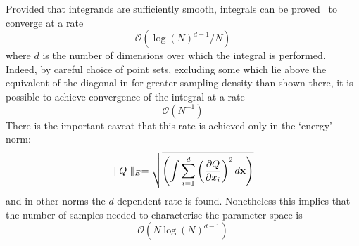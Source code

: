 Provided that integrands are sufficiently smooth,
integrals can be proved~\cite{Bu04Spar} to converge at a rate
\begin{equation}\label{eq:sparsec}
\mathcal{O}(\log(N)^{d-1}/N)
\end{equation}
where $d$ is the number of dimensions over which the integral is performed.
Indeed, by careful choice of point sets, excluding some which
lie above the equivalent of the diagonal in  for
greater sampling density than shown there,
it is possible to achieve convergence of the integral at a rate
\begin{equation}\label{eq:sparsen}
\mathcal{O}(N^{-1})
\end{equation}
There is the important caveat that this rate is achieved only in
the `energy' norm:
\begin{equation}\label{eq:ennorm}
\parallel Q \parallel_E = \sqrt{\left(\int \sum_{i=1}^d \left(\frac{\partial Q}{\partial x_i}\right)^2 d{\bf x}\right)}
\end{equation}
and in other norms the $d$-dependent rate  is found. Nonetheless
this implies that the number of samples needed to characterise the
parameter space is
\begin{equation}\label{eq:nsparsec}
\mathcal{O}(N \log(N)^{d-1})
\end{equation}

